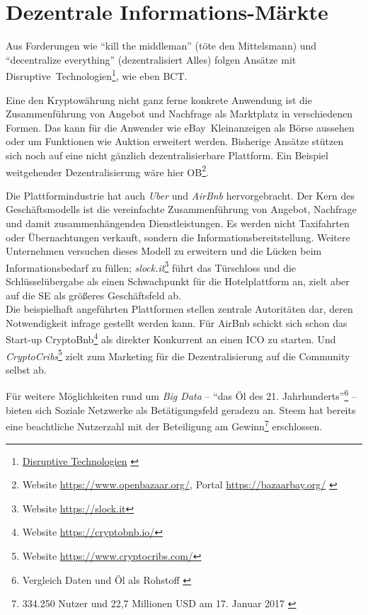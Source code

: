 
\section{Dezentrale Informations-Märkte}

Aus Forderungen wie \enquote{kill the middleman} (töte den Mittelsmann) und \enquote{decentralize everything} (dezentralisiert Alles) folgen Ansätze mit \mbox{Disruptive Technologien}\footnote{\href{http://wirtschaftslexikon.gabler.de/Definition/disruptive-technologien.html}{Disruptive Technologien} \autocite{w:lexika-econimics}}, wie eben \gls{BCT}.

Eine den Kryptowährung nicht ganz ferne konkrete Anwendung ist die Zusammenführung von Angebot und Nachfrage als Marktplatz in verschiedenen Formen. Das kann für die Anwender wie \mbox{eBay Kleinanzeigen} als Börse aussehen oder um Funktionen wie Auktion erweitert werden. Bisherige Ansätze stützen sich noch auf eine nicht gänzlich dezentralisierbare Plattform. Ein Beispiel weitgehender Dezentralisierung wäre hier \gls{OB}\footnote{Website \url{https://www.openbazaar.org/}, Portal \url{https://bazaarbay.org/} \autocite{w:openbazaar}}.

Die Plattformindustrie hat auch \emph{Uber} und \emph{AirBnb} hervorgebracht. Der Kern des Geschäftsmodells ist die vereinfachte Zusammenführung von Angebot, Nachfrage und damit zusammenhängenden Dienstleistungen. Es werden nicht Taxifahrten oder Übernachtungen verkauft, sondern die Informationsbereitstellung. Weitere Unternehmen versuchen dieses Modell zu erweitern und die Lücken beim Informationsbedarf zu füllen; \emph{slock.it}\footnote{Website \url{https://slock.it}} führt das Türschloss und die Schlüsselübergabe als einen Schwachpunkt für die Hotelplattform an, zielt aber auf die \gls{SE} als größeres Geschäftsfeld ab.\\
Die beispielhaft angeführten Plattformen stellen zentrale Autoritäten dar, deren Notwendigkeit infrage gestellt werden kann. Für AirBnb schickt sich schon das Start-up CryptoBnb\footnote{Website \url{https://cryptobnb.io/}} als direkter Konkurrent an einen \gls{ICO} zu starten. Und \emph{CryptoCribs}\footnote{Website \url{https://www.cryptocribs.com/}} zielt zum Marketing für die Dezentralisierung auf die Community selbst ab.

Für weitere Möglichkeiten rund um \emph{Big Data}%
 -- \enquote{das Öl des 21. Jahrhunderts}\footnote{Vergleich Daten und Öl als Rohstoff \autocite{b:spitz-daten}} -- bieten sich Soziale Netzwerke als Betätigungsfeld geradezu an. Steem hat bereits eine beachtliche Nutzerzahl mit der Beteiligung am Gewinn\footnote{334.250 Nutzer und 22,7 Millionen USD am 17. Januar 2017 \autocite{w:steem}} erschlossen. 

